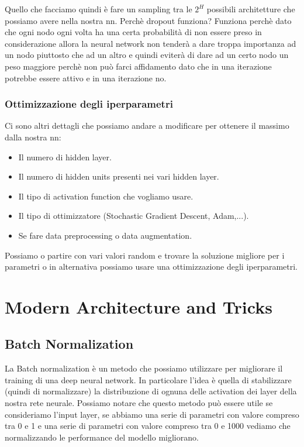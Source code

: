 \documentclass[14pt]{extreport}
\begin{document}
\begin{itemize}
\begin{figure}[H]
		\end{figure}
	Quello che facciamo quindi è fare un sampling tra le $2^H$ possibili architetture che possiamo avere nella nostra nn.
	Perchè dropout funziona? Funziona perchè dato che ogni nodo ogni volta ha una certa probabilità di non essere preso in considerazione 
	allora la neural network non tenderà a dare troppa importanza ad un nodo piuttosto che ad un altro e quindi eviterà di dare ad un certo nodo
	un peso maggiore perchè non può farci affidamento dato che in una iterazione potrebbe essere attivo e in una iterazione no. 
\end{itemize}

\subsubsection{Ottimizzazione degli iperparametri}

Ci sono altri dettagli che possiamo andare a modificare per ottenere il massimo dalla nostra nn:
\begin{itemize}
	\item Il numero di hidden layer.
	\item Il numero di hidden units presenti nei vari hidden layer.
	\item Il tipo di activation function che vogliamo usare.
	\item Il tipo di ottimizzatore (Stochastic Gradient Descent, Adam,...).
	\item Se fare data preprocessing o data augmentation.
	\end{itemize}

Possiamo o partire con vari valori random e trovare la soluzione migliore per i parametri o in alternativa possiamo usare una ottimizzazione degli iperparametri.

\section{Modern Architecture and Tricks}

\subsection{Batch Normalization}

La Batch normalization è un metodo che possiamo utilizzare per migliorare il training di
una deep neural network. In particolare l'idea è quella di stabilizzare (quindi di normalizzare) 
la distribuzione di ognuna delle activation dei layer della nostra rete neurale. Possiamo notare che questo metodo può
essere utile se consideriamo l'input layer, se abbiamo una serie di parametri con valore compreso tra 0 e 1 
e una serie di parametri con valore compreso tra 0 e 1000 vediamo che normalizzando le performance del modello migliorano.
\end{document}
